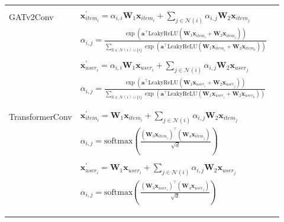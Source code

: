\documentclass[bst/sn-nature]{sn-jnl}
\begin{document}
\begin{appendices}
\begin{longtable}{|l|l|l|}
     & \\
    GATv2Conv & $\mathbf{x}^{\prime}_{item_{i}} = \alpha_{i,i}\mathbf{W}_{1}\mathbf{x}_{item_{i}} + \sum_{j \in \mathcal{N}(i)} \alpha_{i,j}\mathbf{W}_{2}\mathbf{x}_{item_{j}}$\\
    & $\alpha_{i,j} = \frac{\exp\left(\mathbf{a}^{\top}\mathrm{LeakyReLU}\left(\mathbf{W}_{1} \mathbf{x}_{item_{i}} + \mathbf{W}_{2} \mathbf{x}_{item_{j}}\right)\right)}{\sum_{k \in \mathcal{N}(i) \cup \{ i \}} \exp\left(\mathbf{a}^{\top}\mathrm{LeakyReLU}\left(\mathbf{W}_{1} \mathbf{x}_{item_{i}} + \mathbf{W}_{2} \mathbf{x}_{item_{k}}\right)\right)}$ \\
     & \\
    & $\mathbf{x}^{\prime}_{user_{i}} = \alpha_{i,i}\mathbf{W}_{1}\mathbf{x}_{user_{i}} + \sum_{j \in \mathcal{N}(i)} \alpha_{i,j}\mathbf{W}_{2}\mathbf{x}_{user_{j}}$\\
    & $\alpha_{i,j} = \frac{\exp\left(\mathbf{a}^{\top}\mathrm{LeakyReLU}\left(\mathbf{W}_{1} \mathbf{x}_{user_{i}} + \mathbf{W}_{2} \mathbf{x}_{user_{j}}\right)\right)}{\sum_{k \in \mathcal{N}(i) \cup \{ i \}} \exp\left(\mathbf{a}^{\top}\mathrm{LeakyReLU}\left(\mathbf{W}_{1} \mathbf{x}_{user_{i}} + \mathbf{W}_{2} \mathbf{x}_{user_{k}}\right)\right)}$ \\
     & \\
    
    \rowcolor[gray]{0.9} & \\
    \rowcolor[gray]{0.9} TransformerConv & $\mathbf{x}^{\prime}_{item_{i}} = \mathbf{W}_1 \mathbf{x}_{item_{i}} + \sum_{j \in \mathcal{N}(i)} \alpha_{i,j} \mathbf{W}_2 \mathbf{x}_{item_{j}}$  \\
    \rowcolor[gray]{0.9} & $\alpha_{i,j} = \textrm{softmax} \left( \frac{(\mathbf{W}_3\mathbf{x}_{item_{i}})^{\top} (\mathbf{W}_4\mathbf{x}_{item_{j}})} {\sqrt{d}} \right)$ \\
    \rowcolor[gray]{0.9} & \\
    \rowcolor[gray]{0.9} & $\mathbf{x}^{\prime}_{user_{i}} = \mathbf{W}_1 \mathbf{x}_{user_{i}} + \sum_{j \in \mathcal{N}(i)} \alpha_{i,j} \mathbf{W}_2 \mathbf{x}_{user_{j}}$ \\
    \rowcolor[gray]{0.9} & $\alpha_{i,j} = \textrm{softmax} \left( \frac{(\mathbf{W}_3\mathbf{x}_{user_{i}})^{\top} (\mathbf{W}_4\mathbf{x}_{user_{j}})} {\sqrt{d}} \right)$ \\
    \rowcolor[gray]{0.9} & \\

    \hline
    \multicolumn{3}{c}{} \\
    \multicolumn{3}{c}{} \\
    

\end{longtable}
\end{appendices}
\end{document}
